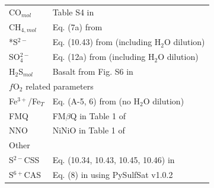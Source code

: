 \begin{table}[!thbp]
\begin{tabular}{ll}
        CO$_{mol}$ &	Table S4 in \textcite{hughes2024} \\
        CH$_{4,mol}$ &	Eq. (7a) from \textcite{ardia2013} \\
        *S$^{2-}$ &	Eq. (10.43) from \textcite{o2021thermodynamic} (including H$_2$O dilution) \\
        SO$_4^{2-}$ &	Eq. (12a) from \textcite{Oneill2022} (including H$_2$O dilution) \\
        H$_2$S$_{mol}$ &	Basalt from Fig. S6 in \textcite{hughes2024} \\
        \midrule
        \multicolumn{2}{l}{$f$O$_2$ related parameters} \\
        \midrule
        Fe$^{3+}$/Fe${_T}$ &	Eq. (A-5, 6) from \textcite{Kress1991} (no H$_2$O dilution) \\
        FMQ &	FM$\beta$Q in Table 1 of \textcite{Frost1991}\\
        NNO &	NiNiO in Table 1 of \textcite{Frost1991} \\
        \midrule
        \multicolumn{2}{l}{Other} \\
        \midrule
        S$^{2-}$CSS &	Eq. (10.34, 10.43, 10.45, 10.46) in \textcite{o2021thermodynamic} \\
        S$^{6+}$CAS &	Eq. (8) in \textcite{chowdhury2019effect} using PySulfSat v1.0.2 \parencite{wieser2023pysulfsat}  \\
        \bottomrule
\end{tabular}
\end{table}